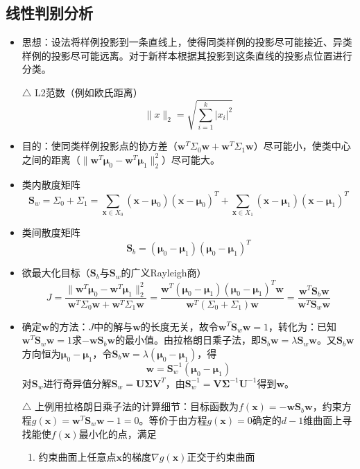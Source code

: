 \documentclass{ctexart}
\begin{document}
				\subsection{线性判别分析}
					\begin{itemize}
						\item 思想：设法将样例投影到一条直线上，使得同类样例的投影尽可能接近、异类样例的投影尽可能远离。对于新样本根据其投影到这条直线的投影点位置进行分类。\begin{framed}
							$\triangle$ L2范数（例如欧氏距离）\[\parallel x\parallel_2=\sqrt{\sum_{i=1}^{k}|x_i|^2}\]
						\end{framed}
						\item 目的：使同类样例投影点的协方差（$\bm{w}^T\Sigma_{0}^{}\bm{w}+\bm{w}^T\Sigma_{1}^{}\bm{w}$）尽可能小，使类中心之间的距离（$\parallel\bm{w}^T\bm{\mu}_0-\bm{w}^T\bm{\mu}_1\parallel_2^2$）尽可能大。
						\item 类内散度矩阵\[\bm{S}_w=\Sigma_{0}+\Sigma_{1}=\sum_{\bm{x}\in X_0}^{}(\bm{x}-\bm{\mu}_0)(\bm{x}-\bm{\mu}_0)^T+\sum_{\bm{x}\in X_1}^{}(\bm{x}-\bm{\mu}_1)(\bm{x}-\bm{\mu}_1)^T\]
						\item 类间散度矩阵\[\bm{S}_b=(\bm{\mu}_0-\bm{\mu}_1)(\bm{\mu}_0-\bm{\mu}_1)^T\]
						\item 欲最大化目标（$\bm{S}_b$与$\bm{S}_w$的广义Rayleigh商）\[J=\frac{\parallel\bm{w}^T\bm{\mu}_0-\bm{w}^T\bm{\mu}_1\parallel_2^2}{\bm{w}^T\Sigma_{0}^{}\bm{w}+\bm{w}^T\Sigma_{1}^{}\bm{w}}=\frac{\bm{w}^T(\bm{\mu}_0-\bm{\mu}_1)(\bm{\mu}_0-\bm{\mu}_1)^T\bm{w}}{\bm{w}^T(\Sigma_{0}+\Sigma_{1})\bm{w}}=\frac{\bm{w}^T\bm{S}_b\bm{w}}{\bm{w}^T\bm{S}_w\bm{w}}\]
						\item 确定$\bm{w}$的方法：$J$中的解与$\bm{w}$的长度无关，故令$\bm{w}^T\bm{S}_w\bm{w}=1$，转化为：已知$\bm{w}^T\bm{S}_w\bm{w}=1$求$-\bm{w}\bm{S}_b\bm{w}$的最小值。由拉格朗日乘子法，即$\bm{S}_b\bm{w}=\lambda\bm{S}_w\bm{w}$。又$\bm{S}_b\bm{w}$方向恒为$\bm{\mu}_0-\bm{\mu}_1$，令$\bm{S}_b\bm{w}=\lambda(\bm{\mu}_0-\bm{\mu}_1)$，得\[\bm{w}=\bm{S}_w^{-1}(\bm{\mu}_0-\bm{\mu}_1)\]对$\bm{S}_w$进行奇异值分解$\bm{S}_w=\bm{U\Sigma V}^T$，由$\bm{S}_w^{-1}=\bm{V\Sigma}^{-1}\bm{U}^{-1}$得到$\bm{w}$。
						\begin{framed}
							$\triangle$ 上例用拉格朗日乘子法的计算细节：目标函数为$f(\bm{x})=-\bm{w}\bm{S}_b\bm{w}$，约束方程$g(\bm{x})=\bm{w}^T\bm{S}_w\bm{w}-1=0$。等价于由方程$g(\bm{x})=0$确定的$d-1$维曲面上寻找能使$f(\bm{x})$最小化的点，满足\begin{enumerate}[(1)]
								\item 约束曲面上任意点$\bm{x}$的梯度$\nabla g(\bm{x})$正交于约束曲面

\end{enumerate}
\end{framed}
\end{itemize}
\end{document}
